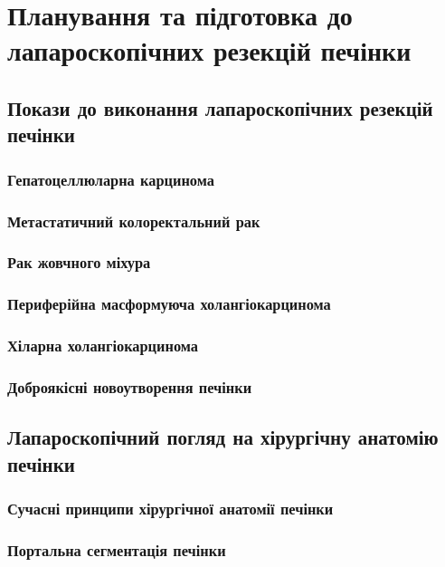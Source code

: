 \chapter[Планування та підготовка]{Планування та підготовка до лапароскопічних резекцій печінки}
\begin{refsection}
\section{Покази до виконання лапароскопічних резекцій печінки}

\subsection{Гепатоцеллюларна карцинома}

\subsection{Метастатичний колоректальний рак}

\subsection{Рак жовчного міхура}

\subsection{Периферійна масформуюча холангіокарцинома}

\subsection{Хіларна холангіокарцинома}

\subsection{Доброякісні новоутворення печінки}

\section{Лапароскопічний погляд на хірургічну анатомію печінки}

\subsection{Сучасні принципи хірургічної анатомії печінки}

\subsection{Портальна сегментація печінки}


\end{refsection}

